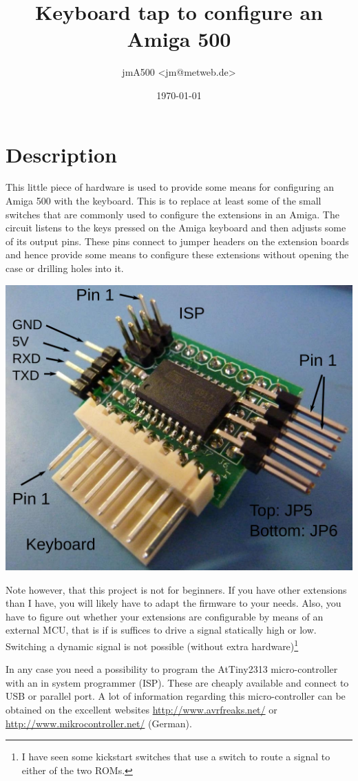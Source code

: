 \documentclass[DIV10]{scrartcl}
\author{jmA500 <jm@metweb.de>}
\date{\today}
\title{Keyboard tap to configure an Amiga 500}
\begin{document}
\maketitle
\section{Description}
This little piece of hardware is used to provide some means for
configuring an Amiga 500 with the keyboard. This is to replace at
least some of the small switches that are commonly used to configure
the extensions in an Amiga. The circuit listens to the keys pressed
on the Amiga keyboard and then adjusts some of its output pins. These
pins connect to jumper headers on the extension boards and hence provide some
means to configure these extensions without opening the case or
drilling holes into it.
\begin{center}
  \includegraphics[width=.7\linewidth]{config-annot}
\end{center}
Note however, that this project is not for beginners. If you have
other extensions than I have, you will likely have to adapt the
firmware to your needs. Also, you have to figure out whether your
extensions are configurable by means of an external MCU, that is if is
suffices to drive a signal statically high or low. Switching a dynamic
signal is not possible (without extra hardware)\footnote{I have seen
  some kickstart switches that use a switch to route a signal to
  either of the two ROMs.} 

In any case you need a possibility to program the AtTiny2313
micro-controller with an in system programmer (ISP). These are cheaply
available and connect to USB or parallel port. A lot of information
regarding this micro-controller can be obtained on the
excellent websites \url{http://www.avrfreaks.net/} or
\url{http://www.mikrocontroller.net/} (German).
\end{document}
